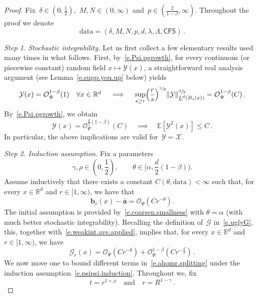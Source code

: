 \documentclass[11pt]{article} %
\numberwithin{equation}{section}
\theoremstyle{definition}
\let\originalleft\left
\let\originalright\right
\renewcommand{\left}{\mathopen{}\mathclose\bgroup\originalleft}
\renewcommand{\right}{\aftergroup\egroup\originalright}
\newcommand*{\R}{\ensuremath{\mathbb{R}}}
\renewcommand{\b}{\ensuremath{\mathbf{b}}}
\newcommand{\qand}{\quad \mbox{and} \quad }
\renewcommand{\a}{\mathbf{a}}
\newcommand{\ahom}{\bar{\a}}
\newcommand{\E}{\mathbb{E}}
\newcommand{\X}{\mathcal{X}}
\renewcommand{\O}{\mathcal{O}}
\newcommand{\Y}{\ensuremath{\mathcal{Y}}}
\newcommand{\data}{\mathrm{data}}
\newcommand{\CFS}{\mathsf{CFS}}
\begin{document}
\begin{proof}
Fix~$\delta \in (0,\frac12)$,~$M,N \in (0,\infty)$ and~$p \in (\frac{2}{1-\beta},\infty)$. Throughout the proof we denote
\begin{equation*}  
\data = (\delta,M,N,p,d,\lambda,\Lambda,\CFS)
\,.
\end{equation*} 


\emph{Step 1. Stochastic integrability.} 
Let us first collect a few elementary results used many times in what follows. First, by~\eqref{e.Psi.pgrowth}, for every continuous (or piecewise constant) random field $x \mapsto \Y(x)$, a straightforward real analysis argument (see Lemma~\ref{e.supp.you.up} below) yields
\begin{equation}  \label{e.weakint.ave.applied}
\mathcal{Y}(x) = \O_{\Psi}^{1-\beta}(1) \quad
\mbox{$\forall x \in \R^d$}
\quad \implies \quad  
\sup_{s \geq r} \Bigl( \frac{r}{s}\Bigr)^{\sfrac12}  \left\| \Y \right\|_{\underline{L}^d \left( B_{s}(x) \right)}^{\sfrac d2}
=
\O_{\Psi}^{1-\beta}(C) \,.
\end{equation}
By~\eqref{e.Psi.pgrowth}, we obtain 
\begin{equation}  \label{e.weakint.ave.expectation}
\mathcal{Y}(x) = \O_{\Psi}^{\frac d2(1-\beta)}(C) 
\quad \implies \quad  
\E[ \Y^2(x)]  \leq C \,.
\end{equation}
In particular, the above implications are valid for~$\Y = \X$. 

\smallskip

\emph{Step 2. Induction assumption.}  Fix a parameters 
\begin{equation}  \label{e.varthetaupper}
\gamma, \rho \in (0,\frac12), \qquad \theta \in \Big[\alpha , \frac{d}{2}(1-\beta) \Big) . 
\end{equation}
Assume inductively that there exists a constant $C(\theta,\data)<\infty$ such that, for every $x \in \R^d$ and $r \in [1,\infty)$, we have that 
\begin{equation} \label{e.psipsi.induction}
\b_r(x) - \ahom  = \O_{\Psi} ( C r^{-\theta} ). 
\end{equation} 
The initial assumption is provided by~\eqref{e.coarsen.smallness} with $\theta = \alpha$ (with much better stochastic integrability). Recalling the definition of~$\mathcal{G}$ in~\eqref{e.uglyG}, this, together with~\eqref{e.weakint.ave.applied}, implies that, for every $x \in \R^d$ and $r \in [1,\infty)$, we have
\begin{equation} \label{e.psipsi.uglyG}
\mathcal{G}_r(x) 
= 
\O_{\Psi} ( C r^{-\theta} )
+
\O_{\Psi}^{1-\beta   } ( C r^{-\frac{d}{2}} )
\,.
\end{equation}
We now move one to bound different terms in~\eqref{e.ahomr.splitting} under the induction assumption~\eqref{e.psipsi.induction}.  Throughout we, fix
\begin{equation*}  
t = r^{1+\rho} 
\qand
r = R^{1-\gamma}
\,.
\end{equation*}







\end{proof}
\end{document}
